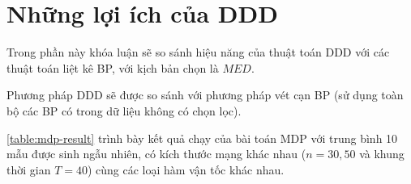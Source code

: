 \documentclass[../main.tex]{subfiles}
\begin{document}
\section{Những lợi ích của
DDD}\label{nhux1eefng-lux1ee3i-uxedch-cux1ee7a-ddd}

Trong phần này khóa luận sẽ so sánh hiệu năng của thuật toán DDD với các thuật
toán liệt kê BP, với kịch bản chọn là \(MED\).

Phương pháp DDD sẽ được so sánh với phương pháp vét cạn BP (sử dụng toàn bộ các BP có trong dữ liệu không có chọn lọc).

\autoref{table:mdp-result} trình bày kết quả chạy của bài toán MDP với trung bình 10 mẫu được sinh ngẫu
nhiên, có kích thước mạng khác nhau (\(n=30,50\) và khung thời gian
\(T=40\)) cùng các loại hàm vận tốc khác nhau.

\end{document}
